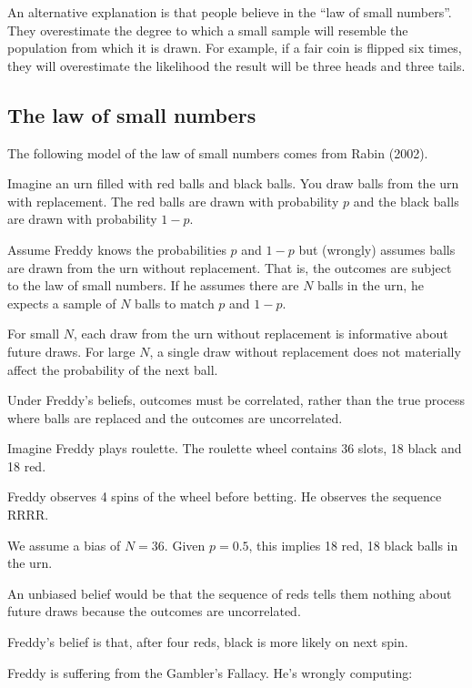\documentclass[
  letterpaper,
  DIV=11,
  numbers=noendperiod]{scrreprt}
\begin{document}
An alternative explanation is that people believe in the ``law of small
numbers''. They overestimate the degree to which a small sample will
resemble the population from which it is drawn. For example, if a fair
coin is flipped six times, they will overestimate the likelihood the
result will be three heads and three tails.

\hypertarget{the-law-of-small-numbers}{%
\subsection{The law of small numbers}\label{the-law-of-small-numbers}}

The following model of the law of small numbers comes from Rabin (2002).

Imagine an urn filled with red balls and black balls. You draw balls
from the urn with replacement. The red balls are drawn with probability
\(p\) and the black balls are drawn with probability \(1−p\).

Assume Freddy knows the probabilities \(p\) and \(1−p\) but (wrongly)
assumes balls are drawn from the urn without replacement. That is, the
outcomes are subject to the law of small numbers. If he assumes there
are \(N\) balls in the urn, he expects a sample of \(N\) balls to match
\(p\) and \(1−p\).

For small \(N\), each draw from the urn without replacement is
informative about future draws. For large \(N\), a single draw without
replacement does not materially affect the probability of the next ball.

Under Freddy's beliefs, outcomes must be correlated, rather than the
true process where balls are replaced and the outcomes are uncorrelated.

Imagine Freddy plays roulette. The roulette wheel contains 36 slots, 18
black and 18 red.

Freddy observes 4 spins of the wheel before betting. He observes the
sequence RRRR.

We assume a bias of \(N=36\). Given \(p=0.5\), this implies 18 red, 18
black balls in the urn.

An unbiased belief would be that the sequence of reds tells them nothing
about future draws because the outcomes are uncorrelated.

Freddy's belief is that, after four reds, black is more likely on next
spin.

Freddy is suffering from the Gambler's Fallacy. He's wrongly computing:
\end{document}
